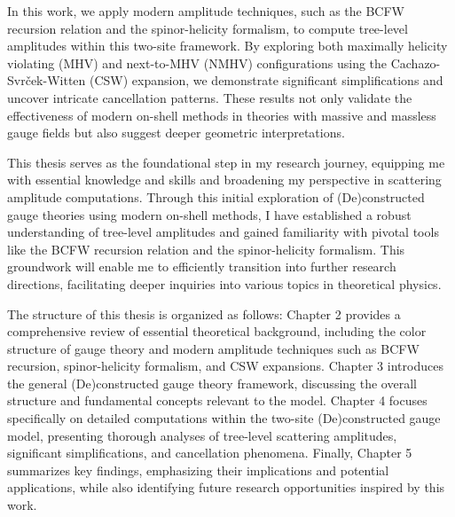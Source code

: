 \documentclass[12pt]{article}
\numberwithin{equation}{section}
\begin{document}
In this work, we apply modern amplitude techniques, such as the BCFW recursion relation and the spinor-helicity formalism, to compute tree-level amplitudes within this two-site framework. By exploring both maximally helicity violating (MHV) and next-to-MHV (NMHV) configurations using the Cachazo-Svrček-Witten (CSW) expansion, we demonstrate significant simplifications and uncover intricate cancellation patterns. These results not only validate the effectiveness of modern on-shell methods in theories with massive and massless gauge fields but also suggest deeper geometric interpretations.

This thesis serves as the foundational step in my research journey, equipping me with essential knowledge and skills and broadening my perspective in scattering amplitude computations. Through this initial exploration of (De)constructed gauge theories using modern on-shell methods, I have established a robust understanding of tree-level amplitudes and gained familiarity with pivotal tools like the BCFW recursion relation and the spinor-helicity formalism. This groundwork will enable me to efficiently transition into further research directions, facilitating deeper inquiries into various topics in theoretical physics.

The structure of this thesis is organized as follows: Chapter 2 provides a comprehensive review of essential theoretical background, including the color structure of gauge theory and modern amplitude techniques such as BCFW recursion, spinor-helicity formalism, and CSW expansions. Chapter 3 introduces the general (De)constructed gauge theory framework, discussing the overall structure and fundamental concepts relevant to the model. Chapter 4 focuses specifically on detailed computations within the two-site (De)constructed gauge model, presenting thorough analyses of tree-level scattering amplitudes, significant simplifications, and cancellation phenomena. Finally, Chapter 5 summarizes key findings, emphasizing their implications and potential applications, while also identifying future research opportunities inspired by this work.
\end{document}
